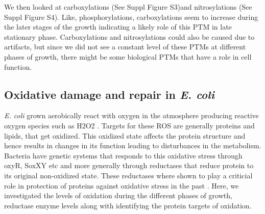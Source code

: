 \documentclass[12pt]{article}
\begin{document}
We then looked at carboxylations (See Suppl Figure S3)and nitrosylations (See Suppl Figure S4). Like, phosphorylations, carboxylations seem to increase during the later stages of the growth indicating a likely role of this PTM in late stationary phase. Carboxylations and nitrosylations could also be caused due to artifacts, but since we did not see a constant level of these PTMs at different phases of growth, there might be some biological PTMs that have a role in cell function. 

\subsection{Oxidative damage and repair in \emph{E. coli}}
%
%   
%   
%   
%

\emph{E. coli} grown aerobically react with oxygen in the atmosphere producing reactive oxygen species such as H2O2 \cite{GonzalezDemple1995}. Targets for these ROS are generally proteins and lipids, that get oxidized. This oxidized state affects the protein structure and hence results in changes in its function leading to disturbances in the metabolism. Bacteria have genetic systems that responds to this oxidative stress through oxyR, SoxXY etc and more generally through reductases that reduce protein to its original non-oxidized state. These reductases where shown to play a criticial role in protection of proteins against oxidative stress in the past \cite{Vogt1995}. Here, we investigated the levels of oxidation during the different phases of growth, reductase enzyme levels along with identifying the protein targets of oxidation.
\end{document}
